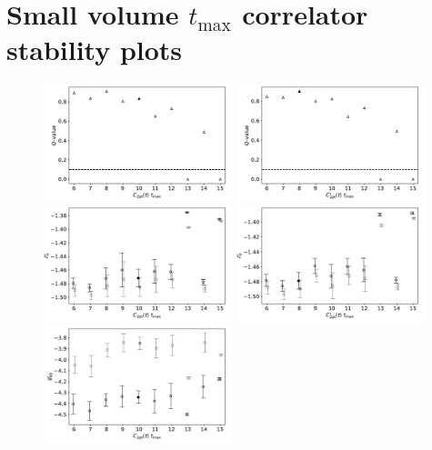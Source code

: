 \documentclass[prd,aps,twocolumn,superscriptaddress,tightenlines,nofootinbib,floatfix,preprintnumbers,10pt]{revtex4-1}
\begin{document}
\section{Small volume $t_{\mathrm{max}}$ correlator stability plots}
\begin{figure}[h]{
		\includegraphics[width=0.49\textwidth]{plots/figures/3296_2pt_tmax_Q.pdf}
		\includegraphics[width=0.49\textwidth]{plots/figures/3296_d2pt_tmax_Q.pdf}
		\includegraphics[width=0.49\textwidth]{plots/figures/3296_2pt_tmax_dZ0.pdf}
		\includegraphics[width=0.49\textwidth]{plots/figures/3296_d2pt_tmax_dZ0.pdf}
		\includegraphics[width=0.49\textwidth]{plots/figures/3296_2pt_tmax_dgV.pdf}
}
\end{figure}
\end{document}
